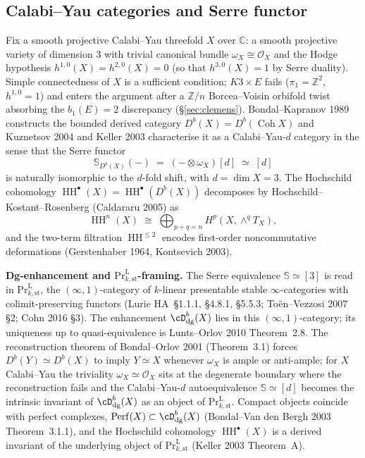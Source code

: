 \documentclass[11pt,reqno]{amsart}
\theoremstyle{plain}
\theoremstyle{definition}
\theoremstyle{remark}
\DeclareMathOperator{\Coh}{Coh}
\DeclareMathOperator{\HH}{HH}
\newcommand{\Cbb}{\mathbb{C}}
\newcommand{\Zbb}{\mathbb{Z}}
\newcommand{\cO}{\mathcal{O}}
\begin{document}
\subsection{Calabi--Yau categories and Serre functor}
\label{subsec:cy-serre}
Fix a smooth projective Calabi--Yau threefold $X$ over $\Cbb$: a smooth projective variety of dimension $3$ with trivial canonical bundle $\omega_X \cong \cO_X$ and the Hodge hypothesis $h^{1,0}(X) = h^{2,0}(X) = 0$ (so that $h^{3,0}(X) = 1$ by Serre duality). Simple connectedness of $X$ is a sufficient condition; $K3 \times E$ fails ($\pi_1 = \Zbb^2$, $h^{1,0} = 1$) and enters the argument after a $\Zbb/n$ Borcea--Voisin orbifold twist absorbing the $b_1(E) = 2$ discrepancy (§\ref{sec:clemens}). Bondal--Kapranov 1989 constructs the bounded derived category $D^b(X) = D^b(\Coh X)$ and Kuznetsov 2004 and Keller 2003 characterise it as a Calabi--Yau-$d$ category in the sense that the Serre functor
\[
  \mathbb{S}_{D^b(X)}(-) \;=\; (- \otimes \omega_X)[d] \;\simeq\; [d]
\]
is naturally isomorphic to the $d$-fold shift, with $d = \dim X = 3$. The Hochschild cohomology $\HH^\bullet(X) = \HH^\bullet(D^b(X))$ decomposes by Hochschild--Kostant--Rosenberg (Caldararu 2005) as
\[
  \HH^n(X) \;\cong\; \bigoplus_{p+q = n} H^p(X, \wedge^q T_X),
\]
and the two-term filtration $\HH^{\leq 2}$ encodes first-order noncommutative deformations (Gerstenhaber 1964, Kontsevich 2003).

\medskip
\noindent\textbf{Dg-enhancement and $\mathrm{Pr}^{\mathrm{L}}_{k,\mathrm{st}}$-framing.} The Serre equivalence $\mathbb{S} \simeq [3]$ is read in $\mathrm{Pr}^{\mathrm{L}}_{k,\mathrm{st}}$, the $(\infty,1)$-category of $k$-linear presentable stable $\infty$-categories with colimit-preserving functors (Lurie $\mathrm{HA}$~\S1.1.1, \S4.8.1, \S5.5.3; To\"en--Vezzosi 2007 \S2; Cohn 2016 \S3). The enhancement $\cD^{b}_{\mathrm{dg}}(X)$ lies in this $(\infty,1)$-category; its uniqueness up to quasi-equivalence is Lunts--Orlov 2010 Theorem~2.8. The reconstruction theorem of Bondal--Orlov 2001 (Theorem~3.1) forces $D^b(Y) \simeq D^b(X)$ to imply $Y \simeq X$ whenever $\omega_X$ is ample or anti-ample; for $X$ Calabi--Yau the triviality $\omega_X \simeq \cO_X$ sits at the degenerate boundary where the reconstruction fails and the Calabi--Yau-$d$ autoequivalence $\mathbb{S} \simeq [d]$ becomes the intrinsic invariant of $\cD^{b}_{\mathrm{dg}}(X)$ as an object of $\mathrm{Pr}^{\mathrm{L}}_{k,\mathrm{st}}$. Compact objects coincide with perfect complexes, $\mathrm{Perf}(X) \subset \cD^{b}_{\mathrm{dg}}(X)$ (Bondal--Van den Bergh 2003 Theorem~3.1.1), and the Hochschild cohomology $\HH^\bullet(X)$ is a derived invariant of the underlying object of $\mathrm{Pr}^{\mathrm{L}}_{k,\mathrm{st}}$ (Keller 2003 Theorem~A).
\end{document}
